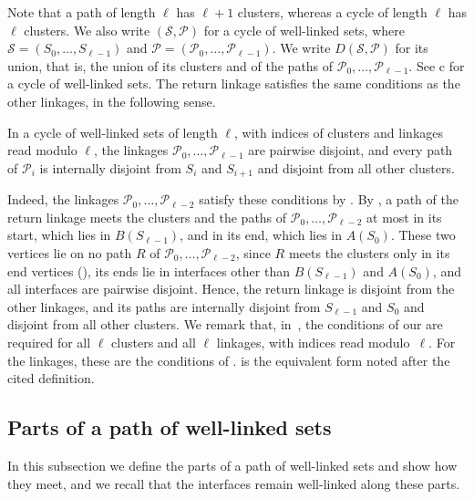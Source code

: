 \documentclass[fontsize=12pt,leading=14pt]{fullpaper}
\newcommand{\Pcal}{\mathcal{P}}
\newcommand{\Scal}{\mathcal{S}}
\begin{document}
Note that a path of length $\ell$ has $\ell+1$ clusters, whereas a cycle of length $\ell$ has $\ell$ clusters.
We also write $(\Scal,\Pcal)$ for a cycle of well-linked sets, where $\Scal=(S_0,\dots,S_{\ell-1})$ and $\Pcal=(\Pcal_0,\dots,\Pcal_{\ell-1})$.
We write $D(\Scal,\Pcal)$ for its union, that is, the union of its clusters and of the paths of $\Pcal_0,\dots,\Pcal_{\ell-1}$.
See c for a cycle of well-linked sets.
The return linkage satisfies the same conditions as the other linkages, in the following sense.

\begin{remark}\label{rem:cycle}
  In a cycle of well-linked sets of length $\ell$, with indices of clusters and linkages read modulo $\ell$, the linkages $\Pcal_0,\dots,\Pcal_{\ell-1}$ are pairwise disjoint, and every path of $\Pcal_i$ is internally disjoint from $S_i$ and $S_{i+1}$ and disjoint from all other clusters.
\end{remark}

Indeed, the linkages $\Pcal_0,\dots,\Pcal_{\ell-2}$ satisfy these conditions by .
By , a path of the return linkage meets the clusters and the paths of $\Pcal_0,\dots,\Pcal_{\ell-2}$ at most in its start, which lies in $B(S_{\ell-1})$, and in its end, which lies in $A(S_0)$.
These two vertices lie on no path $R$ of $\Pcal_0,\dots,\Pcal_{\ell-2}$, since $R$ meets the clusters only in its end vertices (), its ends lie in interfaces other than $B(S_{\ell-1})$ and $A(S_0)$, and all interfaces are pairwise disjoint.
Hence, the return linkage is disjoint from the other linkages, and its paths are internally disjoint from $S_{\ell-1}$ and $S_0$ and disjoint from all other clusters.
We remark that, in~\cite[Definition~3.15]{HKMM26b}, the conditions of our  are required for all $\ell$ clusters and all $\ell$ linkages, with indices read modulo~$\ell$.
For the linkages, these are the conditions of .
 is the equivalent form noted after the cited definition.

\subsection{Parts of a path of well-linked sets}\label{sec:prelim-parts}

In this subsection we define the parts of a path of well-linked sets and show how they meet, and we recall that the interfaces remain well-linked along these parts.
\end{document}
